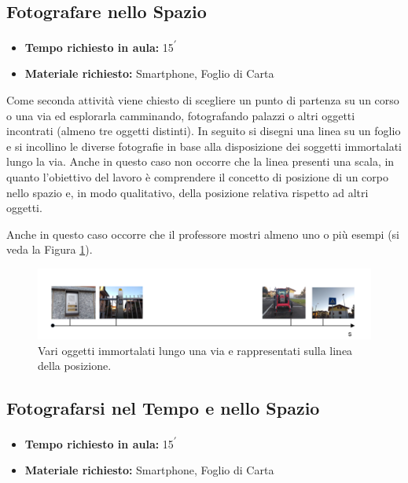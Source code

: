 \documentclass{report} \usepackage[T1]{fontenc} \usepackage[italian]{babel}
\begin{document}
\subsection{Fotografare nello Spazio}

\begin{itemize}
\item \textbf{Tempo richiesto in aula:} 15\textsuperscript{$\prime$}
\item \textbf{Materiale richiesto:} Smartphone, Foglio di Carta
\end{itemize}

Come seconda attività viene chiesto di scegliere un punto di partenza su un
corso o una via ed esplorarla camminando, fotografando palazzi o altri oggetti
incontrati (almeno tre oggetti distinti). In seguito si disegni una linea su un
foglio e si incollino le diverse fotografie in base alla disposizione dei
soggetti immortalati lungo la via. Anche in questo caso non occorre che la
linea presenti una scala, in quanto l’obiettivo del lavoro è comprendere il
concetto di posizione di un corpo nello spazio e, in modo qualitativo, della
posizione relativa rispetto ad altri oggetti.

Anche in questo caso occorre che il professore mostri almeno uno o più esempi
(si veda la Figura \ref{fig:asse_s}).
\begin{figure}[H]
\centering
  \includegraphics[width=\textwidth]{asse_s}
  \caption{Vari oggetti immortalati lungo una via e rappresentati
           sulla linea della posizione.}
  \label{fig:asse_s}
\end{figure}

\subsection{Fotografarsi nel Tempo e nello Spazio}

\begin{itemize}
\item \textbf{Tempo richiesto in aula:} 15\textsuperscript{$\prime$}
\item \textbf{Materiale richiesto:} Smartphone, Foglio di Carta
\end{itemize}
\end{document}
